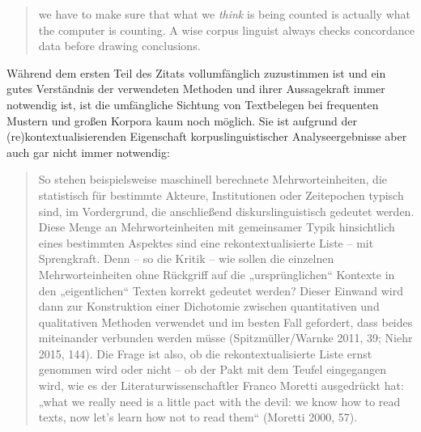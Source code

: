 \begin{quote}
we have to make sure that what we \emph{think} is being counted is actually what the computer is counting. A wise corpus linguist always checks concordance data before drawing conclusions. \autocite[44]{bakerAcceptableBiasUsing2012}
\end{quote}

Während dem ersten Teil des Zitats vollumfänglich zuzustimmen ist und ein gutes Verständnis der verwendeten Methoden und ihrer Aussagekraft immer notwendig ist, ist die umfängliche Sichtung von Textbelegen bei frequenten Mustern und großen Korpora kaum noch möglich. Sie ist aufgrund der (re)kontextualisierenden Eigenschaft korpuslinguistischer Analyseergebnisse aber auch gar nicht immer notwendig:

\begin{quote}
So stehen beispielsweise maschinell berechnete Mehrworteinheiten, die statistisch für bestimmte Akteure, Institutionen oder Zeitepochen typisch sind, im Vordergrund, die anschließend diskurslinguistisch gedeutet werden. Diese Menge an Mehrworteinheiten mit gemeinsamer Typik hinsichtlich eines bestimmten Aspektes sind eine rekontextualisierte Liste -- mit Sprengkraft. Denn -- so die Kritik -- wie sollen die einzelnen Mehrworteinheiten ohne Rückgriff auf die „ursprünglichen`` Kontexte in den „eigentlichen`` Texten korrekt gedeutet werden? Dieser Einwand wird dann zur Konstruktion einer Dichotomie zwischen quantitativen und qualitativen Methoden verwendet und im besten Fall gefordert, dass beides miteinander verbunden werden müsse (Spitzmüller{\slash}Warnke 2011, 39; Niehr 2015, 144). Die Frage ist also, ob die rekontextualisierte Liste ernst genommen wird oder nicht -- ob der Pakt mit dem Teufel eingegangen wird, wie es der Literaturwissenschaftler Franco Moretti ausgedrückt hat: „what we really need is a little pact with the devil: we know how to read texts, now let's learn how not to read them`` (Moretti 2000, 57). \autocites[195]{bubenhoferVisuelleLinguistikZur2020}[siehe auch][]{bubenhoferDreiThesenVisualisierungspraktiken2016}
\end{quote}

